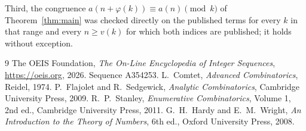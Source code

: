 \documentclass[11pt,a4paper]{article}
\theoremstyle{plain}
\theoremstyle{definition}
\begin{document}
Third, the congruence $a(n+\varphi(k))\equiv a(n)\pmod k$ of Theorem~\ref{thm:main} was
checked directly on the published terms for every $k$ in that range and every $n\ge v(k)$
for which both indices are published; it holds without exception.

\begin{thebibliography}{9}
 The OEIS Foundation, \emph{The On-Line Encyclopedia of Integer
Sequences}, \url{https://oeis.org}, 2026. Sequence A354253.
 L.~Comtet, \emph{Advanced Combinatorics}, Reidel, 1974.
 P.~Flajolet and R.~Sedgewick, \emph{Analytic Combinatorics}, Cambridge
University Press, 2009.
 R.~P.~Stanley, \emph{Enumerative Combinatorics}, Volume 1, 2nd ed.,
Cambridge University Press, 2011.
 G.~H.~Hardy and E.~M.~Wright, \emph{An Introduction to the Theory of
Numbers}, 6th ed., Oxford University Press, 2008.
\end{thebibliography}
\end{document}
